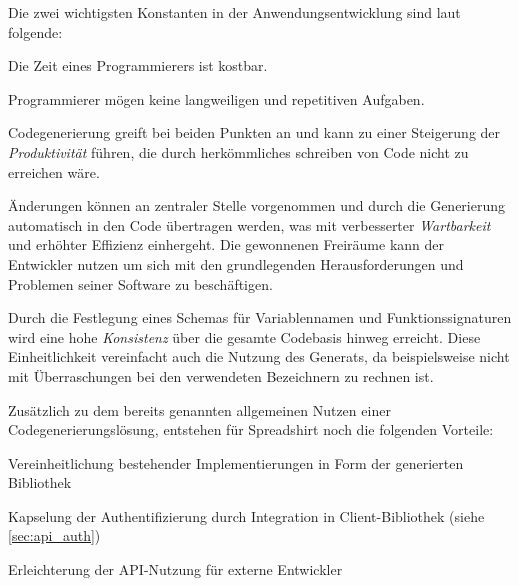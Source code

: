 
Die zwei wichtigsten Konstanten in der Anwendungsentwicklung sind laut \parencite{herrington2003code} folgende:
\begin{compactitem}
    \item Die Zeit eines Programmierers ist kostbar.
    \item Programmierer mögen keine langweiligen und repetitiven Aufgaben.
\end{compactitem}
Codegenerierung greift bei beiden Punkten an und kann zu einer Steigerung der \emph{Produktivität} führen, die durch herkömmliches schreiben von Code nicht zu erreichen wäre. 

Änderungen können an zentraler Stelle vorgenommen und durch die Generierung automatisch in den Code übertragen werden, was mit verbesserter \emph{Wartbarkeit} und erhöhter Effizienz einhergeht.
Die gewonnenen Freiräume kann der Entwickler nutzen um sich mit den grundlegenden Herausforderungen und Problemen seiner Software zu beschäftigen.

Durch die Festlegung eines Schemas für Variablennamen und Funktionssignaturen wird eine hohe \emph{Konsistenz} über die gesamte Codebasis hinweg erreicht.
Diese Einheitlichkeit vereinfacht auch die Nutzung des Generats, da beispielsweise nicht mit Überraschungen bei den verwendeten Bezeichnern zu rechnen ist.



Zusätzlich zu dem bereits genannten allgemeinen Nutzen einer Codegenerierungslösung, entstehen für Spreadshirt noch die folgenden Vorteile:
\begin{compactitem}
    \item Vereinheitlichung bestehender Implementierungen in Form der generierten Bibliothek
    \item Kapselung der Authentifizierung durch Integration in Client-Bibliothek (siehe \cref{sec:api_auth})
    \item Erleichterung der \gls{API}-Nutzung für externe Entwickler
\end{compactitem}


